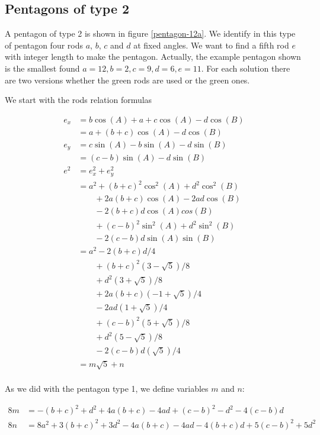 \documentclass[11pt]{article}
\begin{document}
\subsection{Pentagons of type 2}

A pentagon of type 2 is shown in figure \ref{pentagon-12a}. We identify in this type of pentagon four rods $a$, $b$, $c$ and $d$ at fixed angles. We want to find a fifth rod $e$ with integer length to make the pentagon. Actually, the example pentagon shown is the smallest found $a=12, b=2, c=9, d=6, e=11$. For each solution there are two versions whether the green rods are used or the green ones.

We start with the rods relation formulas

\begin{align*}
e_x &= b\cos(A) + a + c\cos(A) - d\cos(B) \\
      &= a + (b + c)\cos(A) - d\cos(B) \\
e_y &= c\sin(A) - b\sin(A) - d\sin(B) \\
      &= (c - b)\sin(A) - d\sin(B) 
\\
e^2 &= e_x^2 + e_y^2 \\
    &= a^2 + (b + c)^2\cos^2(A) + d^2\cos^2(B) \\
    &\qquad + 2a(b + c)\cos(A) - 2ad\cos(B) \\
    &\qquad - 2(b + c)d\cos(A)cos(B) \\
    &\qquad + (c - b)^2\sin^2(A) + d^2\sin^2(B) \\
    &\qquad - 2(c - b)d\sin(A)\sin(B) \\
    &= a^2 - 2(b + c)d / 4 \\
    &\qquad + (b + c)^2 ( 3 - \sqrt{5}) / 8 \\
    &\qquad + d^2       ( 3 + \sqrt{5}) / 8 \\
    &\qquad + 2a(b + c) (-1 + \sqrt{5}) / 4 \\
    &\qquad - 2ad( 1 + \sqrt{5}) / 4 \\
    &\qquad + (c - b)^2 ( 5 + \sqrt{5}) / 8 \\
    &\qquad + d^2       ( 5 - \sqrt{5}) / 8 \\
    &\qquad - 2(c - b)d ( \sqrt{5}) / 4 \\
    &= m\sqrt{5} + n \\
\end{align*}

As we did with the pentagon type 1, we define variables $m$ and $n$:

\begin{align*}
8m &= -(b+c)^2 + d^2 + 4a(b+c) - 4ad + (c-b)^2 - d^2 - 4(c-b)d \\
8n &= 8a^2 + 3(b+c)^2 + 3d^2 - 4a(b+c) - 4ad - 4(b+c)d + 5(c-b)^2 + 5d^2 \\
\end{align*}
\end{document}
